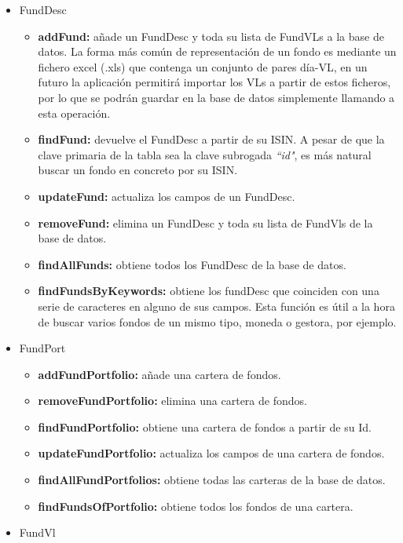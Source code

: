 \documentclass[12pt, a4paper]{article}
\begin{document}
\begin{itemize}
	\item FundDesc
						 \begin{itemize}
							\item \textbf{addFund:} añade un FundDesc y toda su lista de FundVLs a la base de datos. La forma más común de representación de un fondo es mediante un fichero excel (.xls) que contenga un conjunto de pares día-\gls{VL}, en un futuro la aplicación permitirá importar los \gls{VL}s a partir de estos ficheros, por lo que se podrán guardar en la base de datos simplemente llamando a esta operación.
							\item \textbf{findFund:} devuelve el FundDesc a partir de su \gls{ISIN}. A pesar de que la clave primaria de la tabla sea la clave subrogada \textit{``id"}, es más natural buscar un fondo en concreto por su \gls{ISIN}.
							\item \textbf{updateFund:} actualiza los campos de un FundDesc.
							\item \textbf{removeFund:} elimina un FundDesc y toda su lista de FundVls de la base de datos.
							\item \textbf{findAllFunds:} obtiene todos los FundDesc de la base de datos.
							\item \textbf{findFundsByKeywords:} obtiene los fundDesc que coinciden con una serie de caracteres en alguno de sus campos. Esta función es útil a la hora de buscar varios fondos de un mismo tipo, moneda o gestora, por ejemplo.
				 		 \end{itemize}
	\item FundPort
						\begin{itemize}
							\item \textbf{addFundPortfolio:} añade una cartera de fondos.
							\item \textbf{removeFundPortfolio:} elimina una cartera de fondos.
							\item \textbf{findFundPortfolio:} obtiene una cartera de fondos a partir de su Id.
							\item \textbf{updateFundPortfolio:} actualiza los campos de una cartera de fondos.
							\item \textbf{findAllFundPortfolios:} obtiene todas las carteras de la base de datos.
							\item \textbf{findFundsOfPortfolio:} obtiene todos los fondos de una cartera.
						\end{itemize}
					\newpage
	\item FundVl
						\begin{itemize}

\end{itemize}
\end{itemize}
\end{document}
